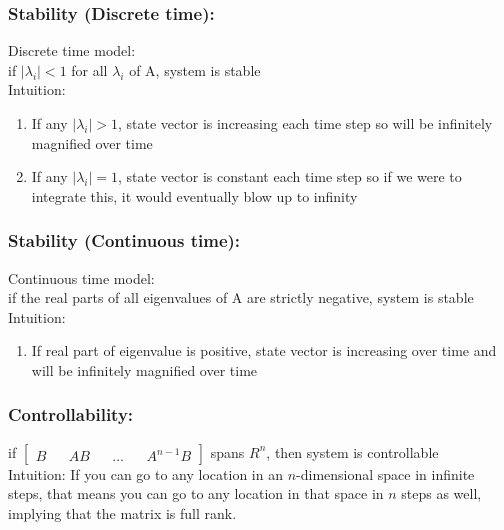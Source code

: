\documentclass{beamer}
\begin{document}
\begin{frame}
\frametitle{Stability (Discrete time):}

Discrete time model: \\
if $|\lambda_{i}| < 1$ for all $\lambda_{i}$ of A, system is stable\\
Intuition: 
\begin{enumerate}
\item If any $|\lambda_{i}| > 1$, state vector is increasing each time step so will be infinitely magnified over time \\
\item If any $|\lambda_{i}| = 1$, state vector is constant each time step so if we were to integrate this, it would eventually blow up to infinity \\
\end{enumerate}
\end{frame}

\begin{frame}
\frametitle{Stability (Continuous time):}

Continuous time model: \\
if the real parts of all eigenvalues of A are strictly negative, system is stable\\
Intuition:
\begin{enumerate}
\item If real part of eigenvalue is positive, state vector is increasing over time and will be infinitely magnified over time \\
\end{enumerate}
\end{frame}

\begin{frame}
\frametitle{Controllability:}

if
$\begin{bmatrix}
B && AB && ... && A^{n-1}B
\end{bmatrix}$
spans $R^{n}$, then system is controllable \\
Intuition: If you can go to any location in an $n$-dimensional space in infinite steps, that means you can go to any location in that space in $n$ steps as well, implying that the matrix is full rank.
\end{frame}
\end{document}
